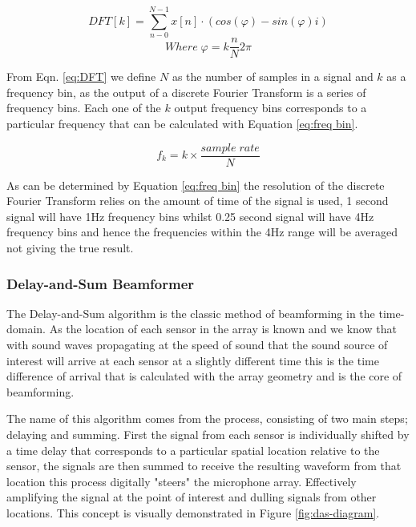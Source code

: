 \documentclass{UoNMCHA}
\numberwithin{equation}{section}
\begin{document}
    \begin{equation}
        DFT[k]=\sum_{n-0}^{N-1}x[n] \cdot (cos(\varphi) - sin(\varphi)i)
        \label{eq:DFT}
    \end{equation}
        \begin{equation*}
        Where \; \varphi = k \frac{n}{N}2 \pi
    \end{equation*}
    
    From Eqn. \ref{eq:DFT} we define $N$ as the number of samples in a signal and $k$ as a frequency bin, as the output of a discrete Fourier Transform is a series of frequency bins. Each one of the $k$ output frequency bins corresponds to a particular frequency that can be calculated with Equation \ref{eq:freq bin}.
    
    \begin{equation}
        f_k = k \times \frac{sample\;rate}{N}
        \label{eq:freq bin}
    \end{equation}
    
    As can be determined by Equation \ref{eq:freq bin} the resolution of the discrete Fourier Transform relies on the amount of time of the signal is used, 1 second signal will have 1Hz frequency bins whilst 0.25 second signal will have 4Hz frequency bins and hence the frequencies within the 4Hz range will be averaged not giving the true result.
    
\subsubsection{Delay-and-Sum Beamformer} \label{sec:DAS Algorithm}
    The Delay-and-Sum algorithm is the classic method of beamforming in the time-domain. As the location of each sensor in the array is known and we know that with sound waves propagating at the speed of sound that the sound source of interest will arrive at each sensor at a slightly different time this is the time difference of arrival that is calculated with the array geometry and is the core of beamforming.
    
    The name of this algorithm comes from the process, consisting of two main steps; delaying and summing. First the signal from each sensor is individually shifted by a time delay that corresponds to a particular spatial location relative to the sensor, the signals are then summed to receive the resulting waveform from that location \citep{GreWeb} this process digitally "steers" the microphone array. Effectively amplifying the signal at the point of interest and dulling signals from other locations. This concept is visually demonstrated in Figure \ref{fig:das-diagram}.
    
\end{document}

